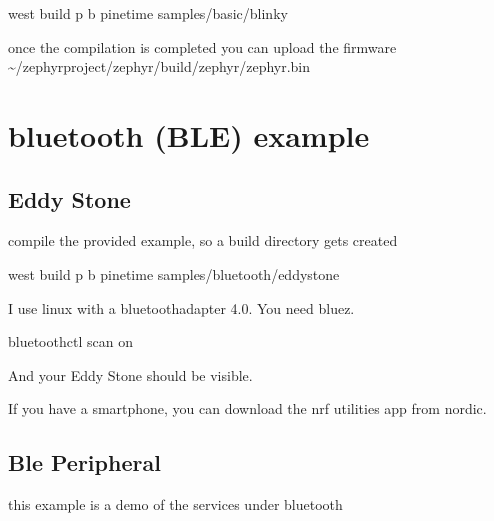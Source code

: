 \documentclass[letterpaper,10pt,english]{sphinxmanual}
\begin{document}

\begin{sphinxVerbatim}[commandchars=\\\{\}]
 west build \PYGZhy{}p \PYGZhy{}b pinetime samples/basic/blinky
\end{sphinxVerbatim}

once the compilation is completed you can upload the firmware
\textasciitilde{}/zephyrproject/zephyr/build/zephyr/zephyr.bin


\chapter{bluetooth (BLE) example}
\label{\detokenize{bluetooth:bluetooth-ble-example}}\label{\detokenize{bluetooth::doc}}

\section{Eddy Stone}
\label{\detokenize{bluetooth:eddy-stone}}
  compile the provided example, so a build directory gets created

\begin{sphinxVerbatim}[commandchars=\\\{\}]
 west build \PYGZhy{}p \PYGZhy{}b pinetime samples/bluetooth/eddystone
\end{sphinxVerbatim}


I use linux with a bluetoothadapter 4.0.
You need bluez.

\begin{sphinxVerbatim}[commandchars=\\\{\}]
bluetoothctl
scan on
\end{sphinxVerbatim}

And your Eddy Stone should be visible.

If you have a smartphone, you can download the nrf utilities app from nordic.


\section{Ble Peripheral}
\label{\detokenize{bluetooth:ble-peripheral}}
this example is a demo of the services under bluetooth
\end{document}
